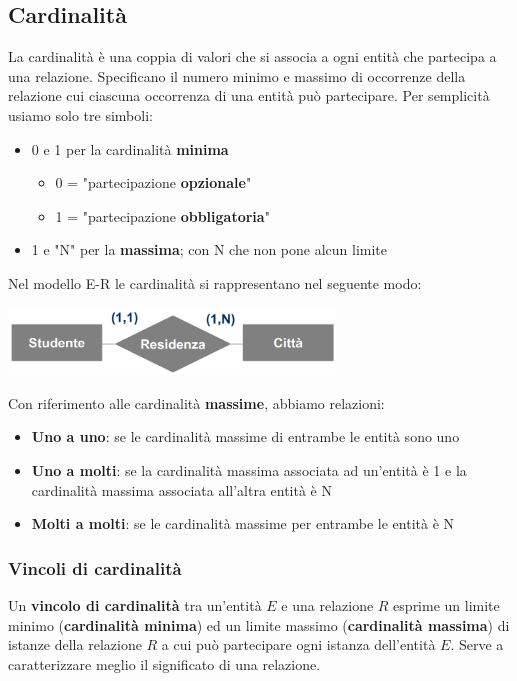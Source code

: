 \documentclass[12pt]{article}
\begin{document}
\subsection{Cardinalità}
La cardinalità è una coppia di valori che si associa a ogni entità che partecipa a una relazione.
Specificano il numero minimo e massimo di occorrenze della relazione cui ciascuna occorrenza di una entità può partecipare.
Per semplicità usiamo solo tre simboli:
\begin{itemize}
    \item 0 e 1 per la cardinalità \textbf{minima}
    \begin{itemize}
        \item 0 = "partecipazione \textbf{opzionale}"
        \item 1 = "partecipazione \textbf{obbligatoria}"
    \end{itemize}
    \item 1 e "N" per la \textbf{massima}; con N che non pone alcun limite
\end{itemize}
Nel modello E-R le cardinalità si rappresentano nel seguente modo:
\begin{center}
    \includegraphics[width = 0.65\textwidth]{Images/32.PNG}
\end{center}
Con riferimento alle cardinalità \textbf{massime}, abbiamo relazioni:
\begin{itemize}
    \item \textbf{Uno a uno}: se le cardinalità massime di entrambe le entità sono uno
    \item \textbf{Uno a molti}: se la cardinalità massima associata ad un'entità è 1 e la cardinalità massima associata all'altra entità è N 
    \item \textbf{Molti a molti}: se le cardinalità massime per entrambe le entità è N
\end{itemize}
\subsubsection{Vincoli di cardinalità}
Un \textbf{vincolo di cardinalità} tra un'entità $E$ e una relazione $R$ esprime un limite minimo (\textbf{cardinalità minima})
ed un limite massimo (\textbf{cardinalità massima}) di istanze della relazione $R$ a cui può partecipare ogni istanza dell'entità $E$.
Serve a caratterizzare meglio il significato di una relazione.
\end{document}
